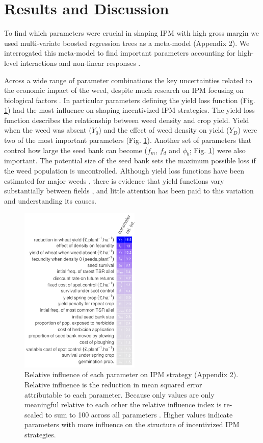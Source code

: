 \documentclass[9pt,twocolumn,twoside,lineno]{pnas-new}
\begin{document}
\section*{Results and Discussion}
To find which parameters were crucial in shaping IPM with high gross margin we used multi-variate boosted regression trees \citep{Mill2016} as a meta-model \citep{Cout2013}(Appendix 2). We interrogated this meta-model to find important parameters accounting for high-level interactions and non-linear responses \citep{Frie2001, Mill2016}.

Across a wide range of parameter combinations the key uncertainties related to the economic impact of the weed, despite much research on IPM focusing on biological factors \citep{Colb2006}. In particular parameters defining the yield loss function (Fig. \ref{fig:rel_inf}) had the most influence on shaping incentivized IPM strategies. The yield loss function describes the relationship between weed density and crop yield. Yield when the weed was absent ($Y_0$) and the effect of weed density on yield ($Y_D$) were two of the most important parameters (Fig. \ref{fig:rel_inf}). Another set of parameters that control how large the seed bank can become ($f_m$, $f_d$ and $\phi_b$; Fig. \ref{fig:rel_inf}) were also important. The potential size of the seed bank sets the maximum possible loss if the weed population is uncontrolled. Although yield loss functions have been estimated for major weeds \citep{Cous1985, Doyl1986, Swin1994}, there is evidence that yield functions vary substantially between fields \citep{Swin1994, Hick2018}, and little attention has been paid to this variation and understanding its causes.
 \begin{figure}
	\centering
	\includegraphics[height=80mm]{rel_inf_mean.pdf}
	\caption{Relative influence of each parameter on IPM strategy (Appendix 2). Relative influence is the reduction in mean squared error attributable to each parameter. Because only values are only meaningful relative to each other the relative influence index is re-scaled to sum to 100 across all parameters \citep{Frie2001, Mill2016}. Higher values indicate parameters with more influence on the structure of incentivized IPM strategies.}
	\label{fig:rel_inf} 
\end{figure}
\end{document}
